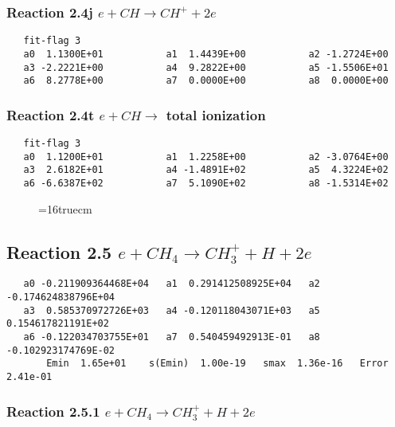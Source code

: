 \documentclass[12pt]{article}
\begin{document}
 
\subsubsection{
Reaction 2.4j      $e + CH \rightarrow CH^{+} + 2e$
}
 
\begin{small}\begin{verbatim} 
   fit-flag 3
   a0  1.1300E+01           a1  1.4439E+00           a2 -1.2724E+00 
   a3 -2.2221E+00           a4  9.2822E+00           a5 -1.5506E+01 
   a6  8.2778E+00           a7  0.0000E+00           a8  0.0000E+00
 \end{verbatim}\end{small}

 
\subsubsection{
Reaction 2.4t      $e + CH \rightarrow$ total ionization 
}
 
\begin{small}\begin{verbatim} 
   fit-flag 3
   a0  1.1200E+01           a1  1.2258E+00           a2 -3.0764E+00
   a3  2.6182E+01           a4 -1.4891E+02           a5  4.3224E+02 
   a6 -6.6387E+02           a7  5.1090E+02           a8 -1.5314E+02
\end{verbatim}\end{small}

 
\begin{figure} \label{met.1_2.3}
\epsfxsize=16truecm
\end{figure}
\newpage
 
\subsection{
Reaction 2.5       $e + CH_4 \rightarrow  CH_3^+ + H + 2e$
}
 
\begin{small}\begin{verbatim} 
   a0 -0.211909364468E+04   a1  0.291412508925E+04   a2 -0.174624838796E+04
   a3  0.585370972726E+03   a4 -0.120118043071E+03   a5  0.154617821191E+02
   a6 -0.122034703755E+01   a7  0.540459492913E-01   a8 -0.102923174769E-02
       Emin  1.65e+01    s(Emin)  1.00e-19   smax  1.36e-16   Error  2.41e-01
\end{verbatim}\end{small}


\subsubsection{
Reaction 2.5.1     $e + CH_{4} \rightarrow CH_{3}^{+} + H + 2e$
}
 
\end{document}
